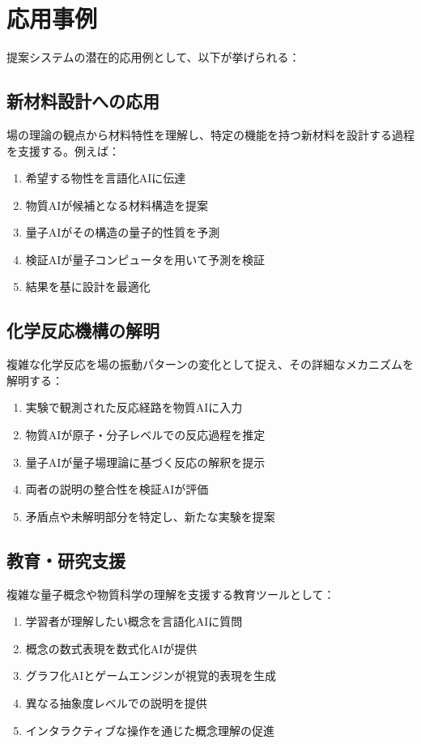 \documentclass[12pt,a4paper]{article}
\begin{document}
\section{応用事例}

提案システムの潜在的応用例として、以下が挙げられる：

\subsection{新材料設計への応用}

場の理論の観点から材料特性を理解し、特定の機能を持つ新材料を設計する過程を支援する。例えば：

\begin{enumerate}
\item 希望する物性を言語化AIに伝達
\item 物質AIが候補となる材料構造を提案
\item 量子AIがその構造の量子的性質を予測
\item 検証AIが量子コンピュータを用いて予測を検証
\item 結果を基に設計を最適化
\end{enumerate}

\subsection{化学反応機構の解明}

複雑な化学反応を場の振動パターンの変化として捉え、その詳細なメカニズムを解明する：

\begin{enumerate}
\item 実験で観測された反応経路を物質AIに入力
\item 物質AIが原子・分子レベルでの反応過程を推定
\item 量子AIが量子場理論に基づく反応の解釈を提示
\item 両者の説明の整合性を検証AIが評価
\item 矛盾点や未解明部分を特定し、新たな実験を提案
\end{enumerate}

\subsection{教育・研究支援}

複雑な量子概念や物質科学の理解を支援する教育ツールとして：

\begin{enumerate}
\item 学習者が理解したい概念を言語化AIに質問
\item 概念の数式表現を数式化AIが提供
\item グラフ化AIとゲームエンジンが視覚的表現を生成
\item 異なる抽象度レベルでの説明を提供
\item インタラクティブな操作を通じた概念理解の促進
\end{enumerate}
\end{document}
